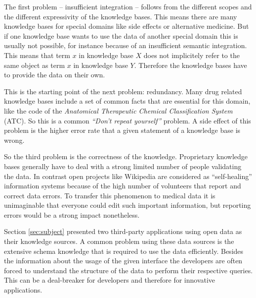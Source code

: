 The first problem -- insufficient integration -- follows from the different scopes and the different expressivity of the knowledge bases.
This means there are many knowledge bases for special domains like side effects or alternative medicine.
But if one knowledge base wants to use the data of another special domain this is usually not possible, for instance because of an insufficient semantic integration.
This means that term $x$ in knowledge base $X$ does not implicitely refer to the same object as term $x$ in knowledge base $Y$.
Therefore the knowledge bases have to provide the data on their own.

This is the starting point of the next problem: redundancy.
Many drug related knowledge bases include a set of common facts that are essential for this domain, like the code of the \textit{Anatomical Therapeutic Chemical Classification System} (ATC).
So this is a common \textit{``Don't repeat yourself''} problem.
A side effect of this problem is the higher error rate that a given statement of a knowledge base is wrong.

So the third problem is the correctness of the knowledge.
Proprietary knowledge bases generally have to deal with a strong limited number of people validating the data.
In contrast open projects like Wikipedia are considered as ``self-healing'' information systems because of the high number of volunteers that report and correct data errors.
To transfer this phenomenon to medical data it is unimaginable that everyone could edit such important information, but reporting errors would be a strong impact nonetheless.

Section \ref{sec:subject} presented two third-party applications using open data as their knowledge sources.
A common problem using these data sources is the extensive schema knowledge that is required to use the data efficiently. 
Besides the information about the usage of the given interface the developers are often forced to understand the structure of the data to perform their respective queries.
This can be a deal-breaker for developers and therefore for innovative applications.

